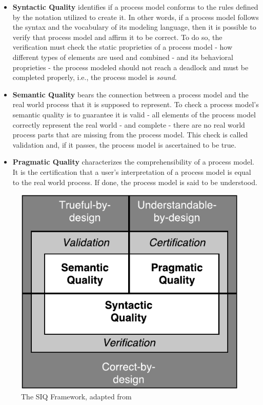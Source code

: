 \documentclass[a4paper,twoside]{article}
\begin{document}
\begin{itemize}
	\item \textbf{Syntactic Quality} identifies if a process model conforms to the rules defined by the notation utilized to create it. In other words, if a process model follows the syntax and the vocabulary of its modeling language, then it is possible to verify that process model and affirm it to be correct. To do so, the verification must check the static proprieties of a process model - how different types of elements are used and combined - and its behavioral proprieties - the process modeled should not reach a deadlock and must be completed properly, i.e., the process model is \textit{sound}.
	\item \textbf{Semantic Quality} bears the connection between a process model and the real world process that it is supposed to represent. To check a process model's semantic quality is to guarantee it is valid - all elements of the process model correctly represent the real world - and complete - there are no real world process parts that are missing from the process model. This check is called validation and, if it passes, the process model is ascertained to be true.
	\item \textbf{Pragmatic Quality} characterizes the comprehensibility of a process model. It is the certification that a user's interpretation of a process model is equal to the real world process. If done, the process model is said to be understood.
\end{itemize}


\begin{figure}
	\centering
	\includegraphics[scale=0.8]{SIQFramework.pdf}
	\caption{The SIQ Framework, adapted from \citet{Reijers2015}}
	\label{SIQFigure}
\end{figure}
\end{document}
